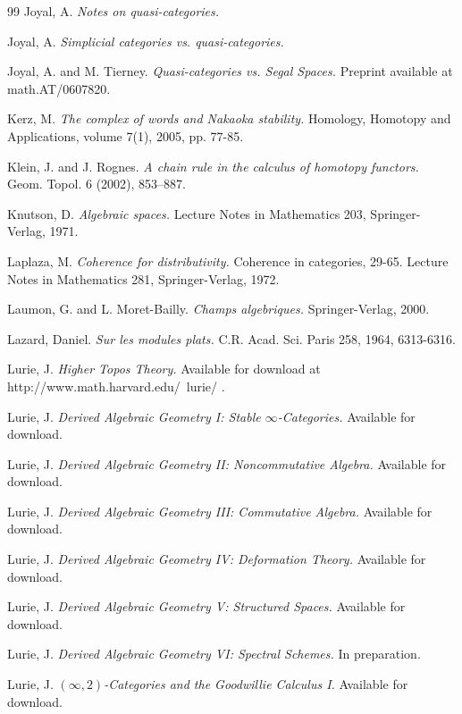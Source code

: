 \documentclass{article}
\theoremstyle{definition}
\begin{document}
\begin{thebibliography}{99}
 Joyal, A. {\it Notes on quasi-categories.}

 Joyal, A. {\it Simplicial categories vs. quasi-categories.}

 Joyal, A. and M. Tierney. {\it Quasi-categories vs. Segal Spaces.} Preprint available at 
math.AT/0607820. 

 Kerz, M. {\it The complex of words and Nakaoka stability.} Homology, Homotopy and Applications, volume 7(1), 2005, pp. 77-85.

 Klein, J. and J. Rognes. {\it A chain rule in the calculus of homotopy functors.} Geom. Topol. 6 (2002), 853--887.

 Knutson, D. {\it Algebraic spaces.} Lecture
Notes in Mathematics 203, Springer-Verlag, 1971.

 Laplaza, M. {\it Coherence for
distributivity.} Coherence in categories, 29-65. Lecture Notes in
Mathematics 281, Springer-Verlag, 1972.

 Laumon, G. and L. Moret-Bailly. {\it Champs
algebriques.} Springer-Verlag, 2000.

 Lazard, Daniel. {\it Sur les modules plats.} C.R.
Acad. Sci. Paris 258, 1964, 6313-6316.

 Lurie, J. {\it Higher Topos Theory.} Available for download at http://www.math.harvard.edu/~lurie/ .

 Lurie, J. {\it Derived Algebraic Geometry I: Stable $\infty$-Categories.} Available for download.

 Lurie, J. {\it Derived Algebraic Geometry II: Noncommutative Algebra.} Available for download.

 Lurie, J. {\it Derived Algebraic Geometry III: Commutative Algebra.} Available for download.

 Lurie, J. {\it Derived Algebraic Geometry IV: Deformation Theory.} Available for download.

 Lurie, J. {\it Derived Algebraic Geometry V: Structured Spaces.} Available for download.

 Lurie, J. {\it Derived Algebraic Geometry VI: Spectral Schemes.} In preparation.

 Lurie, J. {\it $(\infty,2)$-Categories and the Goodwillie Calculus I.} Available for download.


\end{thebibliography}
\end{document}

